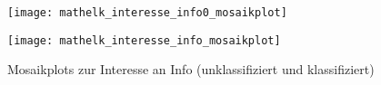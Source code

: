 \documentclass[paper=a4,                 %
               fontsize=12pt,            %
               parskip=half,             %
               ngerman,                 %
               ]{scrartcl}
\begin{document}
\begin{figure}[ht]
   \begin{minipage}{.4\textwidth}
      \texttt{[image: mathelk\_interesse\_info0\_mosaikplot]}
   \end{minipage}
   \hspace{.1\linewidth}%
   \begin{minipage}{.4\textwidth} %
	\texttt{[image: mathelk\_interesse\_info\_mosaikplot]}
   \end{minipage}
      \caption{Mosaikplots zur Interesse an Info (unklassifiziert und klassifiziert)}
\end{figure}
\end{document}

